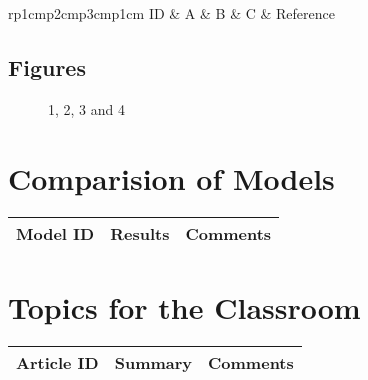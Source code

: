 \centering
\begin{table}[H]\footnotesize
	\caption{}
	\begin{tabular}{rp{1cm}p{2cm}p{3cm}p{1cm}}
		\hline
		ID & A & B & C & Reference \\
		\hline
		\hline
	\end{tabular}
\end{table}
\raggedright

\subsection{Figures}

\begin{figure}[H]
	\centering
	\begin{minipage}[b]{0.5\linewidth}
	\end{minipage}\hfill
	\begin{minipage}[b]{0.5\linewidth}
	\end{minipage}\hfill	
	\begin{minipage}[b]{0.5\linewidth}
	\end{minipage}\hfill
	\begin{minipage}[b]{0.5\linewidth}
	\end{minipage}\hfill
	\caption{1, 2, 3 and 4}
	\label{fig:Figure1}
\end{figure} 


\section{Comparision of Models}

\begin{table}[H]\centering
	\begin{tabular}{p{1cm}p{4cm}p{3cm}}
		Model ID & Results & Comments\\
		\hline
		\hline
	\end{tabular}
\end{table}

\section{Topics for the Classroom}

\begin{table}[H]\centering
	\begin{tabular}{p{1cm}p{4cm}p{3cm}}
		Article ID & Summary & Comments\\
		\hline
		\hline
	\end{tabular}
\end{table}

